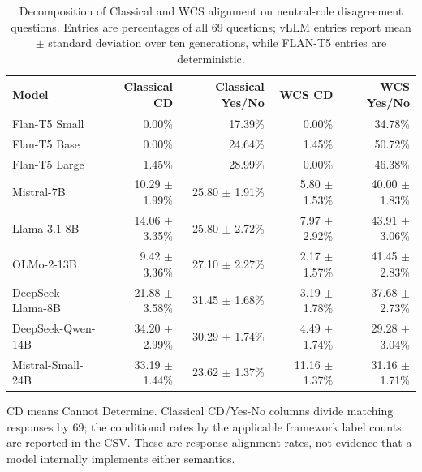 \begin{table}[htbp]
\centering
\scriptsize
\setlength{\tabcolsep}{4pt}
\caption{Decomposition of Classical and WCS alignment on neutral-role disagreement questions. Entries are percentages of all 69 questions; vLLM entries report mean $\pm$ standard deviation over ten generations, while FLAN-T5 entries are deterministic.}
\label{tab:alignment-decomposition}
\begin{tabular}{lrrrr}
\toprule
Model & Classical CD & Classical Yes/No & WCS CD & WCS Yes/No \\
\midrule
Flan-T5 Small & 0.00\% & 17.39\% & 0.00\% & 34.78\% \\
Flan-T5 Base & 0.00\% & 24.64\% & 1.45\% & 50.72\% \\
Flan-T5 Large & 1.45\% & 28.99\% & 0.00\% & 46.38\% \\
Mistral-7B & 10.29 $\pm$ 1.99\% & 25.80 $\pm$ 1.91\% & 5.80 $\pm$ 1.53\% & 40.00 $\pm$ 1.83\% \\
Llama-3.1-8B & 14.06 $\pm$ 3.35\% & 25.80 $\pm$ 2.72\% & 7.97 $\pm$ 2.92\% & 43.91 $\pm$ 3.06\% \\
OLMo-2-13B & 9.42 $\pm$ 3.36\% & 27.10 $\pm$ 2.27\% & 2.17 $\pm$ 1.57\% & 41.45 $\pm$ 2.83\% \\
DeepSeek-Llama-8B & 21.88 $\pm$ 3.58\% & 31.45 $\pm$ 1.68\% & 3.19 $\pm$ 1.78\% & 37.68 $\pm$ 2.73\% \\
DeepSeek-Qwen-14B & 34.20 $\pm$ 2.99\% & 30.29 $\pm$ 1.74\% & 4.49 $\pm$ 1.74\% & 29.28 $\pm$ 3.04\% \\
Mistral-Small-24B & 33.19 $\pm$ 1.44\% & 23.62 $\pm$ 1.37\% & 11.16 $\pm$ 1.37\% & 31.16 $\pm$ 1.71\% \\
\bottomrule
\end{tabular}
\vspace{2pt}
\begin{minipage}{\linewidth}
\scriptsize CD means Cannot Determine. Classical CD/Yes-No columns divide matching responses by 69; the conditional rates by the applicable framework label counts are reported in the CSV. These are response-alignment rates, not evidence that a model internally implements either semantics.
\end{minipage}
\end{table}
